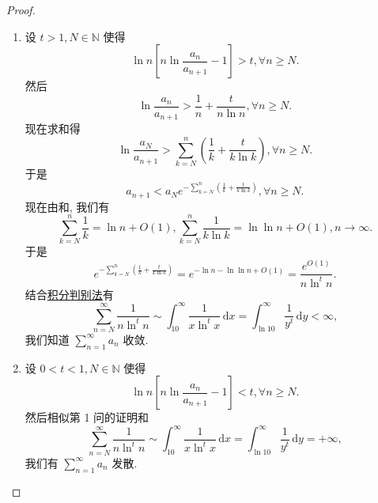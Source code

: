 \documentclass[../../main.tex]{subfiles}
\begin{document}
\begin{proof}
\begin{enumerate}
\item 设 \( t > 1, N \in \mathbb{N} \) 使得
\[
\ln n \left[ n \ln \frac{a_n}{a_{n + 1}} - 1 \right] > t, \forall n \geqslant N.
\]
然后
\[
\ln \frac{a_n}{a_{n + 1}} > \frac{1}{n} + \frac{t}{n \ln n}, \forall n \geqslant N.
\]
现在求和得
\[
\ln \frac{a_N}{a_{n + 1}} > \sum_{k=N}^n \left( \frac{1}{k} + \frac{t}{k \ln k} \right), \forall n \geqslant N.
\]
于是
\[
a_{n + 1} < a_N e^{-\sum\limits_{k=N}^n \left( \frac{1}{k} + \frac{t}{k \ln k} \right)}, \forall n \geqslant N.
\]
现在由和, 我们有
\[
\sum_{k=N}^n \frac{1}{k} = \ln n + O(1), \sum_{k=N}^n \frac{1}{k \ln k} = \ln \ln n + O(1), n \to \infty.
\]
于是
\[
e^{-\sum\limits_{k=N}^n \left( \frac{1}{k} + \frac{t}{k \ln k} \right)} = e^{-\ln n - \ln \ln n + O(1)} = \frac{e^{O(1)}}{n \ln^t n}.
\]
结合\hyperref[theorem:积分判别法]{积分判别法}有
\[
\sum_{n=N}^\infty \frac{1}{n \ln^t n} \sim \int_{10}^\infty \frac{1}{x \ln^t x} \, \mathrm{d}x = \int_{\ln 10}^\infty \frac{1}{y^t} \, \mathrm{d}y < \infty,
\]
我们知道 \( \sum_{n=1}^\infty a_n \) 收敛.

\item 设 \( 0 < t < 1, N \in \mathbb{N} \) 使得
\[
\ln n \left[ n \ln \frac{a_n}{a_{n + 1}} - 1 \right] < t, \forall n \geqslant N.
\]
然后相似第 1 问的证明和
\[
\sum_{n=N}^\infty \frac{1}{n \ln^t n} \sim \int_{10}^\infty \frac{1}{x \ln^t x} \, \mathrm{d}x = \int_{\ln 10}^\infty \frac{1}{y^t} \, \mathrm{d}y = +\infty,
\]
我们有 \( \sum_{n=1}^\infty a_n \) 发散.
\end{enumerate}
\end{proof}
\end{document}
